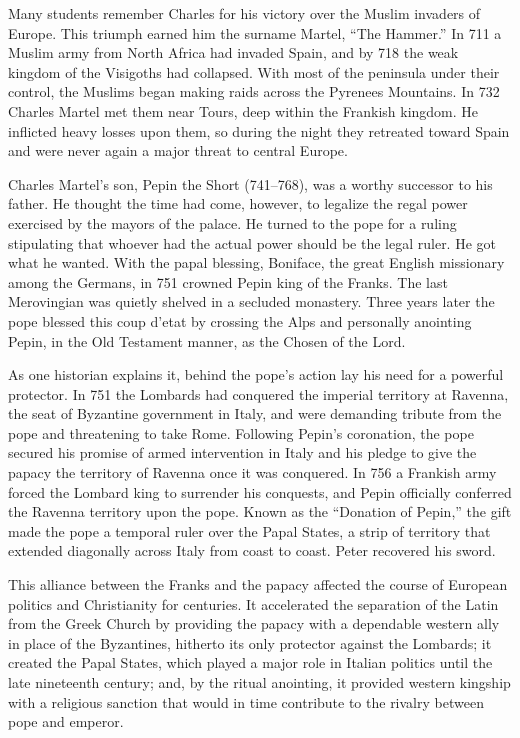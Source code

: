 Many students remember Charles for his victory over the Muslim invaders of Europe. This triumph
earned him the surname Martel, “The Hammer.” In 711 a Muslim army from North Africa had invaded
Spain, and by 718 the weak kingdom of the Visigoths had collapsed. With most of the peninsula under
their control, the Muslims began making raids across the Pyrenees Mountains. In 732 Charles Martel
met them near Tours, deep within the Frankish kingdom. He inflicted heavy losses upon them, so
during the night they retreated toward Spain and were never again a major threat to central Europe.

Charles Martel’s son, Pepin the Short (741–768), was a worthy successor to his father. He thought
the time had come, however, to legalize the regal power exercised by the mayors of the palace. He
turned to the pope for a ruling stipulating that whoever had the actual power should be the legal
ruler. He got what he wanted. With the papal blessing, Boniface, the great English missionary among
the Germans, in 751 crowned Pepin king of the Franks. The last Merovingian was quietly shelved in a
secluded monastery. Three years later the pope blessed this coup d’etat by crossing the Alps and
personally anointing Pepin, in the Old Testament manner, as the Chosen of the Lord.

As one historian explains it, behind the pope’s action lay his need for a powerful protector. In 751
the Lombards had conquered the imperial territory at Ravenna, the seat of Byzantine government in
Italy, and were demanding tribute from the pope and threatening to take Rome. Following Pepin’s
coronation, the pope secured his promise of armed intervention in Italy and his pledge to give the
papacy the territory of Ravenna once it was conquered. In 756 a Frankish army forced the Lombard
king to surrender his conquests, and Pepin officially conferred the Ravenna territory upon the pope.
Known as the “Donation of Pepin,” the gift made the pope a temporal ruler over the Papal States, a
strip of territory that extended diagonally across Italy from coast to coast. Peter recovered his
sword.

This alliance between the Franks and the papacy affected the course of European politics and
Christianity for centuries. It accelerated the separation of the Latin from the Greek Church by
providing the papacy with a dependable western ally in place of the Byzantines, hitherto its only
protector against the Lombards; it created the Papal States, which played a major role in Italian
politics until the late nineteenth century; and, by the ritual anointing, it provided western
kingship with a religious sanction that would in time contribute to the rivalry between pope and
emperor.

